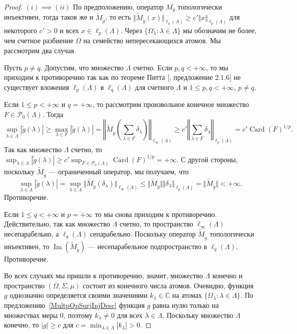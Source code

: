 \begin{proof}
$(i) \implies (ii)$ По предположению, оператор $M_g$ топологически инъективен,
тогда таков же и $\widetilde{M}_{\widetilde{g}}$, то есть
$\Vert\widetilde{M}_{\widetilde{g}}(x)\Vert_{\ell_q(\Lambda)}\geq c'\Vert
x\Vert_{\ell_p(\Lambda)}$ для некоторого $c'>0$ и всех $x\in\ell_p(\Lambda)$.
Через $ \{\Omega_\lambda:\lambda\in\Lambda \}$ мы обозначим не более, чем
счетное разбиение $\Omega$ на семейство непересекающихся атомов. Мы рассмотрим
два случая.

Пусть $p\neq q$. Допустим, что множество $\Lambda$ счетно. Если $p,q<+\infty$,
то мы приходим к противоречию так как по теореме Питта
[\cite{KalAlbTopicsBanSpTh}, предложение 2.1.6] не существует вложения
$\ell_p(\Lambda)$ в $\ell_q(\Lambda)$ для счетного $\Lambda$ и 
$1\leq p,q< +\infty$, $p\neq q$. 

Если $1\leq p<+\infty$ и $q=+\infty$, то рассмотрим произвольное конечное
множество $F\in\mathcal{P}_0(\Lambda)$. Тогда 
$$
\sup_{\lambda\in\Lambda}|\widetilde{g}(\lambda)|
\geq\max_{\lambda\in F}|\widetilde{g}(\lambda)|
=\left\Vert\widetilde{M}_{\widetilde{g}}\left(
    \sum_{\lambda\in F}\delta_\lambda
\right)\right\Vert_{\ell_\infty(\Lambda)}
\geq c'\left\Vert\sum_{\lambda\in F}\delta_\lambda\right\Vert_{\ell_p(\Lambda)}
=c'{\operatorname{Card}(F)}^{1/p}.
$$
Так как множество $\Lambda$ счетно, то
$\sup_{\lambda\in\Lambda}|\widetilde{g}(\lambda)|\geq
c'\sup_{F\in\mathcal{P}_0(\Lambda)}{\operatorname{Card}(F)}^{1/p}=+\infty$. С
другой стороны, поскольку $\widetilde{M}_{\widetilde{g}}$ --- ограниченный
оператор, мы получаем, что 
$$
\sup_{\lambda\in\Lambda}|\widetilde{g}(\lambda)|
=\sup_{\lambda\in\Lambda}\Vert
    \widetilde{M}_{\widetilde{g}}(\delta_\lambda)
\Vert_{\ell_\infty(\Lambda)}
\leq\Vert
    \widetilde{M}_{\widetilde{g}}\Vert\Vert \delta_\lambda
\Vert_{\ell_p(\Lambda)}
=\Vert\widetilde{M}_{\widetilde{g}}\Vert<+\infty.
$$
Противоречие.

Если $1\leq q<+\infty$ и $p=+\infty$ то мы снова приходим к противоречию.
Действительно, так как множество $\Lambda$ счетно, то пространство
$\ell_\infty(\Lambda)$ несепарабельно, а $\ell_q(\Lambda)$ сепарабельно.
Поскольку оператор $\widetilde{M}_{\widetilde{g}}$ топологически инъективен, то
$\operatorname{Im}(\widetilde{M}_{\widetilde{g}})$ --- несепарабельное
подпространство в $\ell_q(\Lambda)$. Противоречие.

Во всех случаях мы пришли к противоречию, значит, множество $\Lambda$ конечно и
пространство $(\Omega,\Sigma,\mu)$ состоит из конечного числа атомов. Очевидно,
функция $g$ однозначно определяется своими значениями $k_\lambda\in\mathbb{C}$
на атомах $ \{\Omega_\lambda:\lambda\in\Lambda \}$. По
предложению~\ref{MultpOpSurjInjDesc} функция $g$ равна нулю только на множествах
меры $0$, поэтому $k_\lambda\neq 0$ для всех $\lambda\in\Lambda$. Поскольку
множество $\Lambda$ конечно, то $|g|\geq c$ для
$c=\min_{\lambda\in\Lambda}|k_\lambda|>0$. 


\end{proof}

